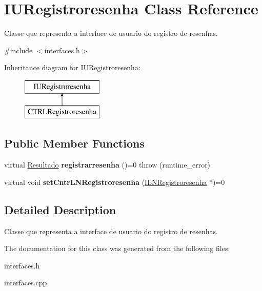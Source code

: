 \hypertarget{classIURegistroresenha}{}\section{I\+U\+Registroresenha Class Reference}
\label{classIURegistroresenha}


Classe que representa a interface de usuario do registro de resenhas.  




{\ttfamily \#include $<$interfaces.\+h$>$}

Inheritance diagram for I\+U\+Registroresenha\+:\begin{figure}[H]
\begin{center}
\leavevmode
\includegraphics[height=2.000000cm]{classIURegistroresenha}
\end{center}
\end{figure}
\subsection*{Public Member Functions}
\begin{DoxyCompactItemize}
\item 
\mbox{\label{classIURegistroresenha_abf6819abf4508a0b9df02e089a2cbba1}} 
virtual \hyperlink{classResultado}{Resultado} {\bfseries registrarresenha} ()=0  throw (runtime\+\_\+error)
\item 
\mbox{\label{classIURegistroresenha_a4cff1619add6e6cb7081b195ce385957}} 
virtual void {\bfseries set\+Cntr\+L\+N\+Registroresenha} (\hyperlink{classILNRegistroresenha}{I\+L\+N\+Registroresenha} $\ast$)=0
\end{DoxyCompactItemize}


\subsection{Detailed Description}
Classe que representa a interface de usuario do registro de resenhas. 

The documentation for this class was generated from the following files\+:\begin{DoxyCompactItemize}
\item 
interfaces.\+h\item 
interfaces.\+cpp\end{DoxyCompactItemize}
